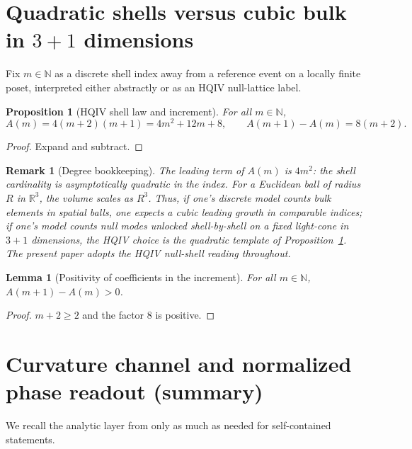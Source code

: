\documentclass[11pt]{amsart}
\newtheorem{lemma}[theorem]{Lemma}
\newtheorem{proposition}[theorem]{Proposition}
\newtheorem{remark}[theorem]{Remark}
\begin{document}
\section{Quadratic shells versus cubic bulk in \texorpdfstring{$3{+}1$}{3+1} dimensions}
\label{sec:quadratic-vs-cubic}

Fix \(m\in\mathbb{N}\) as a discrete shell index away from a reference event on a locally finite poset, interpreted either abstractly or as an HQIV null-lattice label.

\begin{proposition}[HQIV shell law and increment]
\label{prop:shell-law}
For all \(m\in\mathbb{N}\),
\[
A(m)=4(m+2)(m+1)=4m^2+12m+8,\qquad
A(m+1)-A(m)=8(m+2).
\]
\end{proposition}

\begin{proof}
Expand and subtract.
\end{proof}

\begin{remark}[Degree bookkeeping]
The leading term of \(A(m)\) is \(4m^2\): the shell cardinality is asymptotically quadratic in the index. For a Euclidean ball of radius \(R\) in \(\mathbb{R}^3\), the volume scales as \(R^3\). Thus, if one's discrete model counts \emph{bulk} elements in spatial balls, one expects a cubic leading growth in comparable indices; if one's model counts \emph{null} modes unlocked shell-by-shell on a fixed light-cone in \(3{+}1\) dimensions, the HQIV choice is the quadratic template of Proposition~\ref{prop:shell-law}. The present paper adopts the HQIV null-shell reading throughout.
\end{remark}

\begin{lemma}[Positivity of coefficients in the increment]
For all \(m\in\mathbb{N}\), \(A(m+1)-A(m)>0\).
\end{lemma}

\begin{proof}
\(m+2\ge 2\) and the factor \(8\) is positive.
\end{proof}

\section{Curvature channel and normalized phase readout (summary)}
\label{sec:curvature-summary}

We recall the analytic layer from \cite{hqiv-so8-paper} only as much as needed for self-contained statements.
\end{document}
